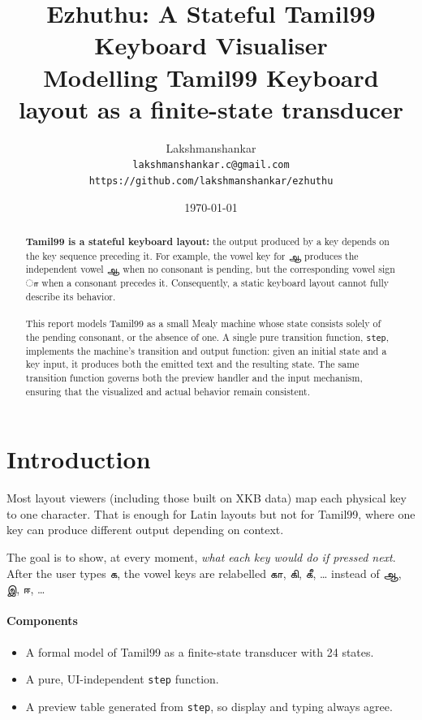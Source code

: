 \documentclass[11pt,a4paper]{article}
\title{\textbf{Ezhuthu: A Stateful Tamil99 Keyboard Visualiser}\\[0.3em]
\large Modelling Tamil99 Keyboard layout as a finite-state transducer}
\author{Lakshmanshankar \\ \texttt{lakshmanshankar.c@gmail.com} \\
\texttt{https://github.com/lakshmanshankar/ezhuthu}}
\date{\today}
\newcommand{\tam}[1]{{\tamilfont #1}}
\begin{document}
\maketitle

\begin{abstract}
\textbf{Tamil99 is a stateful keyboard layout:} the output produced by a key depends on the key sequence preceding it. For example, the vowel key for \tam{ஆ} produces the independent vowel \tam{ஆ} when no consonant is pending, but the corresponding vowel sign \tam{ா} when a consonant precedes it. Consequently, a static keyboard layout cannot fully describe its behavior.
\\
\\This report models Tamil99 as a small Mealy machine whose state consists solely of the pending consonant, or the absence of one. A single pure transition function, \texttt{step}, implements the machine's transition and output function: given an initial state and a key input, it produces both the emitted text and the resulting state. The same transition function governs both the preview handler and the input mechanism, ensuring that the visualized and actual behavior remain consistent.
\end{abstract}

\newpage
\tableofcontents
\newpage

\section{Introduction}
Most layout viewers (including those built on XKB data) map each physical key
to one character. That is enough for Latin layouts but not for Tamil99, where
one key can produce different output depending on context.

The goal is to show, at every moment, \emph{what each key would do if pressed
next}. After the user types \tam{க}, the vowel keys are relabelled
\tam{கா}, \tam{கி}, \tam{கீ}, \ldots{} instead of \tam{ஆ}, \tam{இ}, \tam{ஈ},
\ldots{}

\paragraph{Components}
\begin{itemize}
  \item A formal model of Tamil99 as a finite-state transducer with 24 states.
  \item A pure, UI-independent \texttt{step} function.
  \item A preview table generated from \texttt{step}, so display and typing
        always agree.
\end{itemize}
\end{document}
